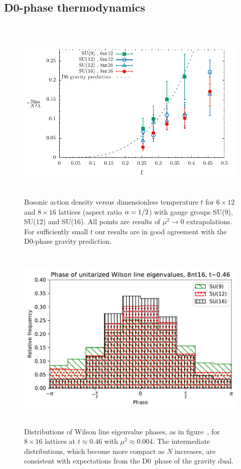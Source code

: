 \subsection{D0-phase thermodynamics}
\begin{figure}[tbp]
  \centering
  \includegraphics[height=9cm]{Figures/alpha050.pdf}
  \caption{\label{fig:alpha05}Bosonic action density versus dimensionless temperature $t$ for $6\times 12$ and $8\times 16$ lattices (aspect ratio $\alpha = 1 / 2$) with gauge groups SU(9), SU(12) and SU(16).  All points are results of $\mu^2 \to 0$ extrapolations.  For sufficiently small $t$ our results are in good agreement with the D0-phase gravity prediction.}
\end{figure}
\begin{figure}[tbp]
  \centering
  \includegraphics[height=9cm]{Figures/WLeig-al05.pdf}
  \caption{\label{fig:WLeig-al05}Distributions of Wilson line eigenvalue phases, as in figure~\protect{\ref{fig:WLeig-highT}}, for $8\times 16$ lattices at $t \approx 0.46$ with $\mu^2 \approx 0.004$.  The intermediate distributions, which become more compact as $N$ increases, are consistent with expectations from the D0~phase of the gravity dual.}
\end{figure}

